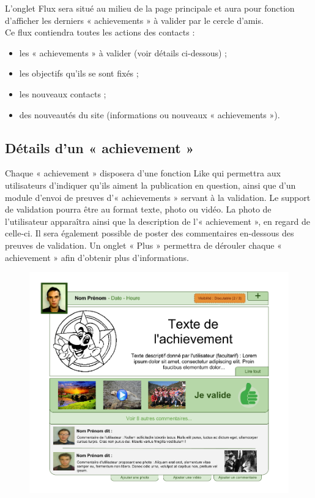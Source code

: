 \documentclass{life-fr}
\begin{document}
L'onglet Flux sera situé au milieu de la page principale et aura pour fonction d'afficher les derniers « achievements » à valider par le cercle d'amis.\\

Ce flux contiendra toutes les actions des contacts :

\begin{itemize}
  \item les « achievements » à valider (voir détails ci-dessous) ;
  \item les objectifs qu'ils se sont fixés ;
  \item les nouveaux contacts ;
  \item des nouveautés du site (informations ou nouveaux « achievements »).
\end{itemize}

\subsection{Détails d'un « achievement »}

Chaque « achievement » disposera d'une fonction Like qui permettra aux utilisateurs d'indiquer qu'ils aiment la publication en question, ainsi que d'un module d'envoi de preuves d'« achievements » servant à la validation. Le support de validation pourra être au format texte, photo ou vidéo. La photo de l'utilisateur apparaîtra ainsi que la description de l'« achievement », en regard de celle-ci. Il sera également possible de poster des commentaires en-dessous des preuves de validation. Un onglet « Plus » permettra de dérouler chaque « achievement » afin d'obtenir plus d'informations.\\

\begin{figure}[H]
  \begin{center}
    \includegraphics[width=15cm]{img/achievement.png}
  \end{center}
\end{figure}
\end{document}
